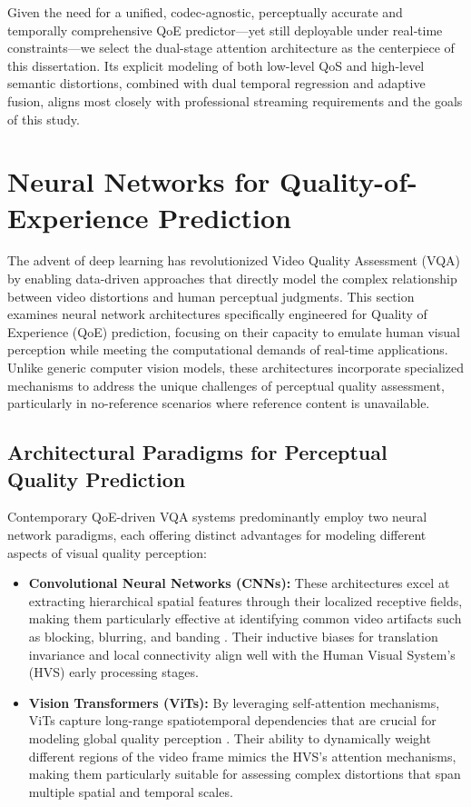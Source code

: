 Given the need for a unified, codec-agnostic, perceptually accurate and temporally comprehensive QoE predictor—yet still deployable under real‐time constraints—we select the dual-stage attention architecture as the centerpiece of this dissertation. Its explicit modeling of both low-level QoS and high-level semantic distortions, combined with dual temporal regression and adaptive fusion, aligns most closely with professional streaming requirements and the goals of this study.  

\section{Neural Networks for Quality-of-Experience Prediction}  
\label{sec:nn_qoe}  

The advent of deep learning has revolutionized Video Quality Assessment (VQA) by enabling data-driven approaches that directly model the complex relationship between video distortions and human perceptual judgments. This section examines neural network architectures specifically engineered for Quality of Experience (QoE) prediction, focusing on their capacity to emulate human visual perception while meeting the computational demands of real-time applications. Unlike generic computer vision models, these architectures incorporate specialized mechanisms to address the unique challenges of perceptual quality assessment, particularly in no-reference scenarios where reference content is unavailable.

\subsection{Architectural Paradigms for Perceptual Quality Prediction}  
Contemporary QoE-driven VQA systems predominantly employ two neural network paradigms, each offering distinct advantages for modeling different aspects of visual quality perception:

\begin{itemize}  
    \item \textbf{Convolutional Neural Networks (CNNs):} These architectures excel at extracting hierarchical spatial features through their localized receptive fields, making them particularly effective at identifying common video artifacts such as blocking, blurring, and banding \cite{he2016deep}. Their inductive biases for translation invariance and local connectivity align well with the Human Visual System's (HVS) early processing stages.
    
    \item \textbf{Vision Transformers (ViTs):} By leveraging self-attention mechanisms, ViTs capture long-range spatiotemporal dependencies that are crucial for modeling global quality perception \cite{dosovitskiy2020image}. Their ability to dynamically weight different regions of the video frame mimics the HVS's attention mechanisms, making them particularly suitable for assessing complex distortions that span multiple spatial and temporal scales.
\end{itemize}  

